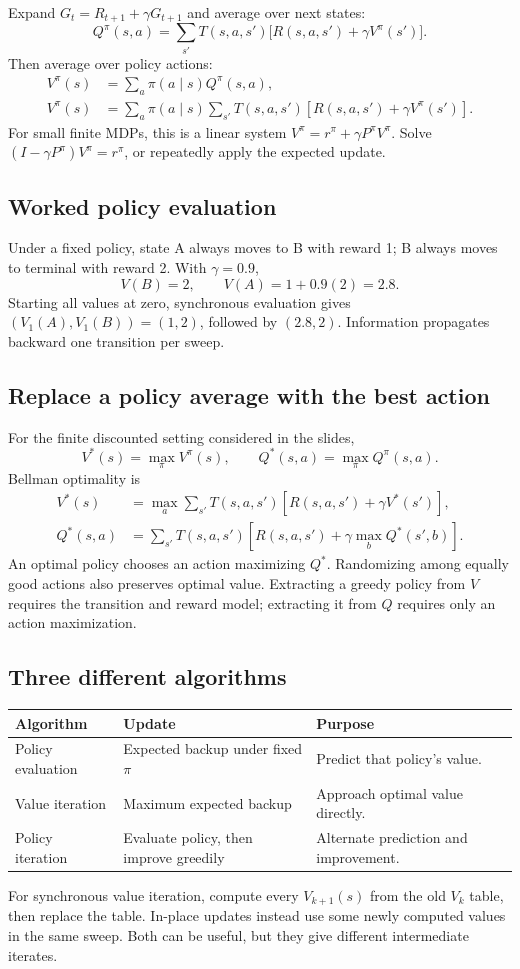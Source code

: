 \documentclass[11pt]{article}
\begin{document}
Expand $G_t=R_{t+1}+\gamma G_{t+1}$ and average over next states:
\[
Q^\pi(s,a)=\sum_{s'}T(s,a,s')\big[R(s,a,s')+\gamma V^\pi(s')\big].
\]
Then average over policy actions:
\begin{align*}
V^\pi(s)&=\sum_a\pi(a\mid s)Q^\pi(s,a),\\
V^\pi(s)&=\sum_a\pi(a\mid s)\sum_{s'}T(s,a,s')
[R(s,a,s')+\gamma V^\pi(s')].
\end{align*}
For small finite MDPs, this is a linear system $V^\pi=r^\pi+\gamma P^\pi V^\pi$. Solve $(I-\gamma P^\pi)V^\pi=r^\pi$, or repeatedly apply the expected update.
\subsection{Worked policy evaluation}
Under a fixed policy, state A always moves to B with reward 1; B always moves to terminal with reward 2. With $\gamma=0.9$,
\[
V(B)=2,\qquad V(A)=1+0.9(2)=2.8.
\]
Starting all values at zero, synchronous evaluation gives $(V_1(A),V_1(B))=(1,2)$, followed by $(2.8,2)$. Information propagates backward one transition per sweep.
\subsection{Replace a policy average with the best action}
For the finite discounted setting considered in the slides,
\[
V^*(s)=\max_\pi V^\pi(s),\qquad Q^*(s,a)=\max_\pi Q^\pi(s,a).
\]
Bellman optimality is
\begin{align*}
V^*(s)&=\max_a\sum_{s'}T(s,a,s')[R(s,a,s')+\gamma V^*(s')],\\
Q^*(s,a)&=\sum_{s'}T(s,a,s')[R(s,a,s')+\gamma\max_bQ^*(s',b)].
\end{align*}
An optimal policy chooses an action maximizing $Q^*$. Randomizing among equally good actions also preserves optimal value. Extracting a greedy policy from $V$ requires the transition and reward model; extracting it from $Q$ requires only an action maximization.
\subsection{Three different algorithms}
\begin{longtable}{@{}P{.23\textwidth}P{.34\textwidth}P{.34\textwidth}@{}}
\toprule Algorithm & Update & Purpose\\\midrule\endhead
Policy evaluation & Expected backup under fixed $\pi$ & Predict that policy's value.\\
Value iteration & Maximum expected backup & Approach optimal value directly.\\
Policy iteration & Evaluate policy, then improve greedily & Alternate prediction and improvement.\\\bottomrule
\end{longtable}
For synchronous value iteration, compute every $V_{k+1}(s)$ from the old $V_k$ table, then replace the table. In-place updates instead use some newly computed values in the same sweep. Both can be useful, but they give different intermediate iterates.
\end{document}
